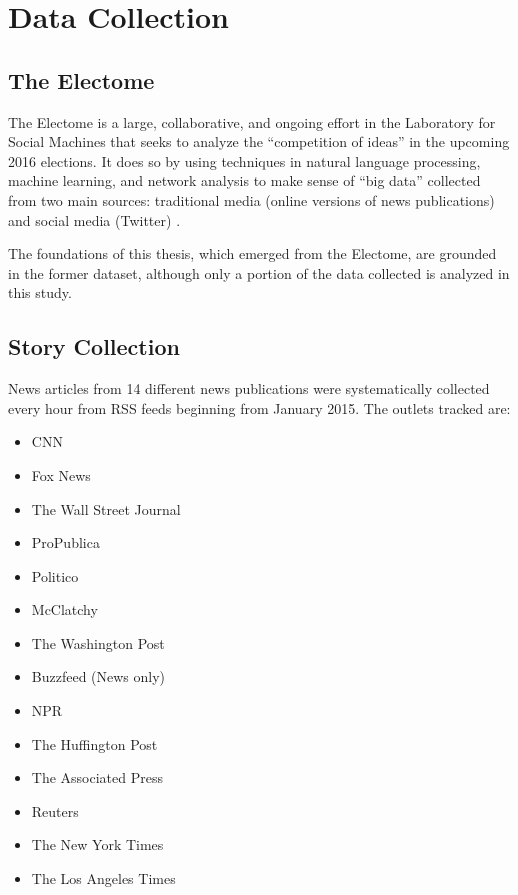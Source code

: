 \chapter{Data Collection}

\section{The Electome}

The Electome is a large, collaborative, and ongoing effort in the Laboratory for Social Machines that seeks to analyze the ``competition of ideas'' in the upcoming 2016 elections. It does so by using techniques in natural language processing, machine learning, and network analysis to make sense of ``big data'' collected from two main sources: traditional media (online versions of news publications) and social media (Twitter) \cite{vvr_electome2016}. 

The foundations of this thesis, which emerged from the Electome, are grounded in the former dataset, although only a portion of the data collected is analyzed in this study.

\section{Story Collection} 

News articles from 14 different news publications were systematically collected every hour from RSS feeds beginning from January 2015. The outlets tracked are:
 
\begin{itemize}
  \item CNN
  \item Fox News
  \item The Wall Street Journal
  \item ProPublica
  \item Politico
  \item McClatchy
  \item The Washington Post
  \item Buzzfeed (News only)
  \item NPR
  \item The Huffington Post
  \item The Associated Press
  \item Reuters
  \item The New York Times
  \item The Los Angeles Times
\end{itemize}

